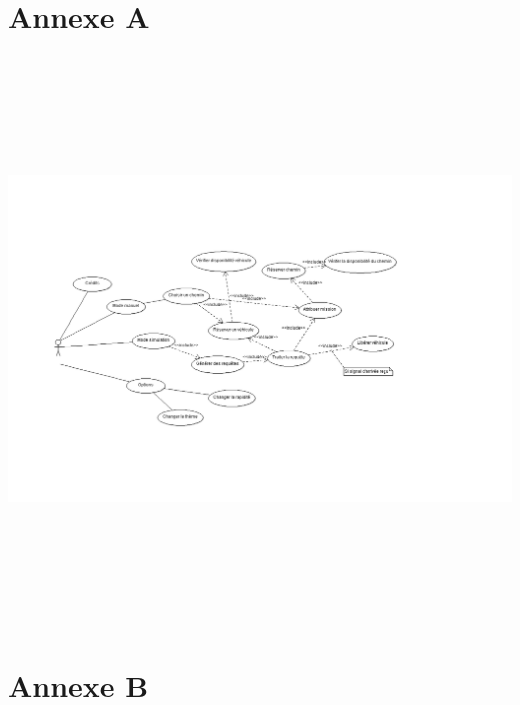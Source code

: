 \documentclass[a4paper, titlepage]{report}
\begin{document}
\chapter*{Annexe A}
\includegraphics[width=20cm, height=15cm]{Images/CasUtilisation.PNG}
\chapter*{Annexe B}
\end{document}
